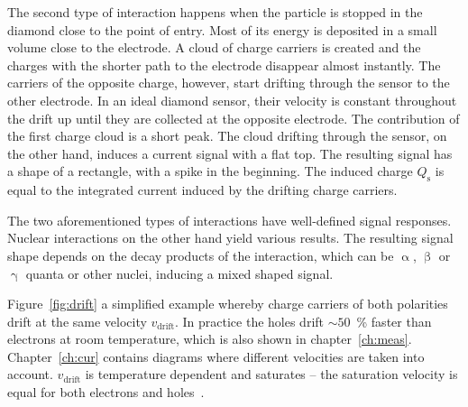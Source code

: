 The second type of interaction happens when the particle is stopped in the diamond close to the point of entry. Most of its energy is deposited in a small volume close to the electrode. A cloud of charge carriers is created and the charges with the shorter path to the electrode disappear almost instantly. The carriers of the opposite charge, however, start drifting through the sensor to the other electrode. In an ideal diamond sensor, their velocity is constant throughout the drift up until they are collected at the opposite electrode. The contribution of the first charge cloud is a short peak. The cloud drifting through the sensor, on the other hand, induces a current signal with a flat top. The resulting signal has a shape of a rectangle, with a spike in the beginning. %
The induced charge $Q_\mathrm{s}$ is equal to the integrated current induced by the drifting charge carriers.

The two aforementioned types of interactions have well-defined signal responses. Nuclear interactions on the other hand yield various results. The resulting signal shape depends on the decay products of the interaction, which can be $\upalpha$, $\upbeta$ or $\upgamma$ quanta or other nuclei, inducing a mixed shaped signal. 

Figure~\ref{fig:drift} a simplified example whereby charge carriers of both polarities drift at the same velocity $v_\mathrm{drift}$. In practice the holes drift $\sim50$~\% faster than electrons at room temperature, which is also shown in chapter~\ref{ch:meas}. Chapter~\ref{ch:cur} contains diagrams where different velocities are taken into account. $v_\mathrm{drift}$ is temperature dependent and saturates -- the saturation velocity is equal for both electrons and holes~\cite{Jansen:1956431}. 


